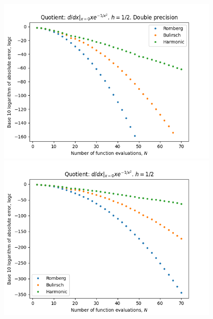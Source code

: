 \begin{figure}[H]
\centering
\begin{minipage}{0.45\textwidth}
\centering
\includegraphics[scale=0.45]{../results/diff_quot_plots/xemxm2.png}
\end{minipage}
\begin{minipage}{0.45\textwidth}
\centering
\includegraphics[scale=0.45]{../results/diff_quot_plots/xemxm2_hp.png}
\end{minipage}
\end{figure}

